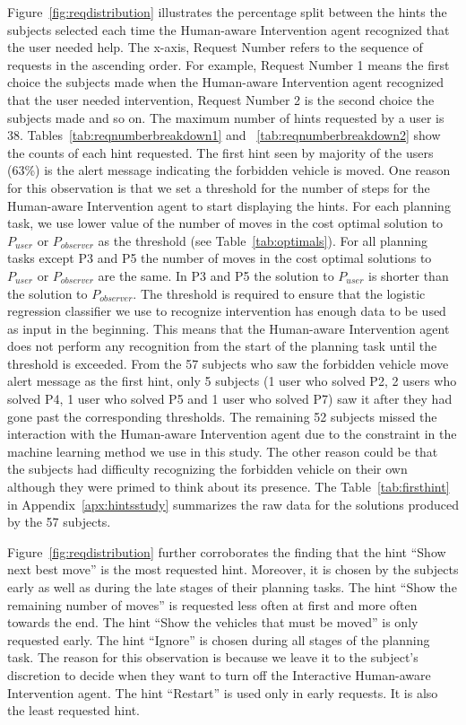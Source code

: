 Figure~\ref{fig:reqdistribution} illustrates the percentage split between the hints the subjects selected each time the Human-aware Intervention agent recognized that the user needed help.
The x-axis, Request Number refers to the sequence of requests in the ascending order. 
For example, Request Number 1 means the first choice the subjects made when the Human-aware Intervention agent recognized that the user needed intervention, Request Number 2 is the second choice the subjects made and so on.
The maximum number of hints requested by a user is 38.
Tables~\ref{tab:reqnumberbreakdown1} and ~\ref{tab:reqnumberbreakdown2} show the counts of  each hint requested.
The first hint seen by majority of the users (63\%) is the alert message indicating the forbidden vehicle is moved.
One reason for this observation is that we set a threshold for the number of steps for the Human-aware Intervention agent to start displaying the hints.
For each planning task, we use lower value of the number of moves in the cost optimal solution to $P_{user}$ or $P_{observer}$ as the threshold (see Table~\ref{tab:optimals}).
For all planning tasks except P3 and P5 the number of moves in the cost optimal solutions to $P_{user}$ or $P_{observer}$ are the same.
In P3 and P5 the solution to $P_{user}$ is shorter than the solution to $P_{observer}$.
The threshold is required to ensure that the logistic regression classifier we use to recognize intervention has enough data to be used as input in the beginning.
This means that the Human-aware Intervention agent does not perform any recognition  from the start of the planning task until the threshold is exceeded.
From the 57 subjects who saw the forbidden vehicle move alert message as the first hint, only 5 subjects (1 user who solved P2, 2 users who solved P4, 1 user who solved P5 and 1 user who solved P7) saw it after they had gone past the corresponding thresholds.
The remaining 52 subjects missed the interaction with the Human-aware Intervention agent due to the constraint in the machine learning method we use in this study.
The other reason could be that the subjects had difficulty recognizing the forbidden vehicle on their own although they were primed to think about its presence. 
The Table~\ref{tab:firsthint} in Appendix~\ref{apx:hintsstudy} summarizes the raw data for the solutions produced by the 57 subjects.

Figure~\ref{fig:reqdistribution} further corroborates the finding that the hint ``Show next best move'' is the most requested hint.
Moreover, it is chosen by the subjects early as well as during the late stages of their planning tasks.
The hint ``Show the remaining number of moves'' is requested less often at first and more often towards the end.
The hint ``Show the vehicles that must be moved'' is only requested early.
The hint ``Ignore'' is chosen during all stages of the planning task.
The reason for this observation is because we leave it to the subject's discretion to decide when they want to turn off the Interactive Human-aware Intervention agent.
The hint ``Restart'' is used only in early requests.
It is also the least requested hint.


